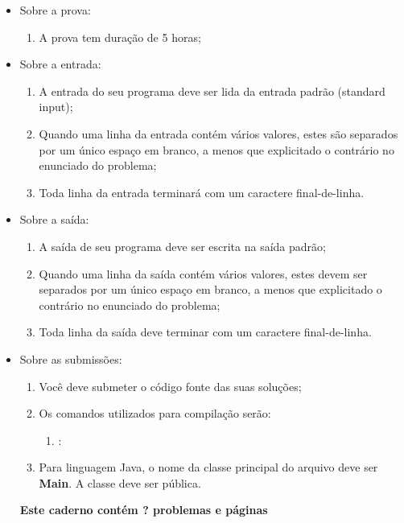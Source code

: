\documentclass[titlepage, oneside, a4paper]{article}
\title{\VAR{contest.title or ""}}
\author{\VAR{contest.location or ""}}
\date{\VAR{contest.date or ""}}
\title{}
\author{}
\date{}
\makeatletter
\let\newtitle\@title
\let\newauthor\@author
\let\newdate\@date
\makeatother
\begin{document}
\begin{frontpage}{\newtitle}{\newauthor}{\newdate}
\begin{itemize}
\item Sobre a prova:
\begin{enumerate}
\item A prova tem duração de 5 horas;
\end{enumerate}
\item Sobre a entrada:
\begin{enumerate}
\item A entrada do seu programa deve ser lida da entrada padrão (standard input);
\item Quando uma linha da entrada contém vários valores, estes são separados por um único espaço em branco, a menos que explicitado o contrário no enunciado do problema;
\item Toda linha da entrada terminará com um caractere final-de-linha.
\end{enumerate}

\item Sobre a saída:
\begin{enumerate}
\item A saída de seu programa deve ser escrita na saída padrão;
\item Quando uma linha da saída contém vários valores, estes devem ser separados por um único espaço em branco, a menos que explicitado o contrário no enunciado do problema;
\item Toda linha da saída deve terminar com um caractere final-de-linha.
\end{enumerate}

\item Sobre as submissões:
\begin{enumerate}
\item Você deve submeter o código fonte das suas soluções;
\item Os comandos utilizados para compilação serão:
\begin{enumerate}
\item {}: 
\end{enumerate}
\item Para linguagem Java, o nome da classe principal do arquivo deve ser \textbf{Main}. A classe deve ser pública.
\end{enumerate}
\centering\vspace*{\fill}\textbf{Este caderno contém ? problemas e \pageref{LastPage} páginas} \\
\vspace*{\fill}
\end{itemize}
\end{frontpage}
\end{document}
